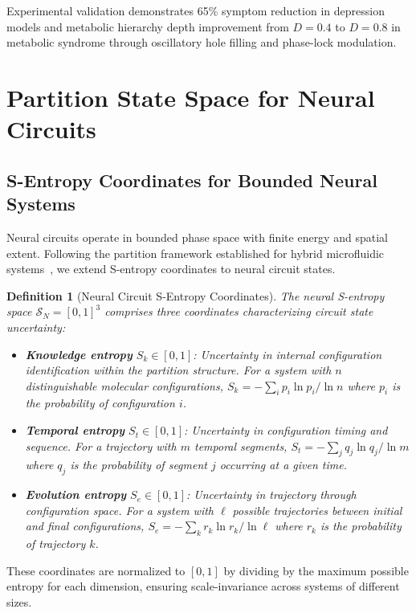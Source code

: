 \documentclass[aps,prd,twocolumn,superscriptaddress,floatfix,nofootinbib]{revtex4-2}
\newtheorem{definition}[theorem]{Definition}
\theoremstyle{remark}
\begin{document}
Experimental validation demonstrates 65\% symptom reduction in depression models and metabolic hierarchy depth improvement from $D = 0.4$ to $D = 0.8$ in metabolic syndrome through oscillatory hole filling and phase-lock modulation.

\section{Partition State Space for Neural Circuits}
\label{sec:foundations}

\subsection{S-Entropy Coordinates for Bounded Neural Systems}

Neural circuits operate in bounded phase space with finite energy and spatial extent. Following the partition framework established for hybrid microfluidic systems~\cite{sachikonye2025partition}, we extend S-entropy coordinates to neural circuit states.

\begin{definition}[Neural Circuit S-Entropy Coordinates]
\label{def:neural_s_entropy}
The neural S-entropy space $\mathcal{S}_N = [0,1]^3$ comprises three coordinates characterizing circuit state uncertainty:
\begin{itemize}
\item \textbf{Knowledge entropy} $S_k \in [0,1]$: Uncertainty in internal configuration identification within the partition structure. For a system with $n$ distinguishable molecular configurations, $S_k = -\sum_i p_i \ln p_i / \ln n$ where $p_i$ is the probability of configuration $i$.

\item \textbf{Temporal entropy} $S_t \in [0,1]$: Uncertainty in configuration timing and sequence. For a trajectory with $m$ temporal segments, $S_t = -\sum_j q_j \ln q_j / \ln m$ where $q_j$ is the probability of segment $j$ occurring at a given time.

\item \textbf{Evolution entropy} $S_e \in [0,1]$: Uncertainty in trajectory through configuration space. For a system with $\ell$ possible trajectories between initial and final configurations, $S_e = -\sum_k r_k \ln r_k / \ln \ell$ where $r_k$ is the probability of trajectory $k$.
\end{itemize}
\end{definition}

These coordinates are normalized to $[0,1]$ by dividing by the maximum possible entropy for each dimension, ensuring scale-invariance across systems of different sizes.
\end{document}
